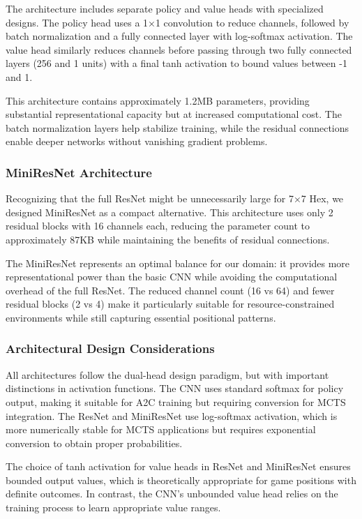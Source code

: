 \documentclass[conference]{IEEEtran}
\begin{document}
The architecture includes separate policy and value heads with specialized designs. The policy head uses a 1×1 convolution to reduce channels, followed by batch normalization and a fully connected layer with log-softmax activation. The value head similarly reduces channels before passing through two fully connected layers (256 and 1 units) with a final tanh activation to bound values between -1 and 1.

This architecture contains approximately 1.2MB parameters, providing substantial representational capacity but at increased computational cost. The batch normalization layers help stabilize training, while the residual connections enable deeper networks without vanishing gradient problems.

\subsubsection{MiniResNet Architecture}

Recognizing that the full ResNet might be unnecessarily large for 7×7 Hex, we designed MiniResNet as a compact alternative. This architecture uses only 2 residual blocks with 16 channels each, reducing the parameter count to approximately 87KB while maintaining the benefits of residual connections.

The MiniResNet represents an optimal balance for our domain: it provides more representational power than the basic CNN while avoiding the computational overhead of the full ResNet. The reduced channel count (16 vs 64) and fewer residual blocks (2 vs 4) make it particularly suitable for resource-constrained environments while still capturing essential positional patterns.

\subsubsection{Architectural Design Considerations}

All architectures follow the dual-head design paradigm, but with important distinctions in activation functions. The CNN uses standard softmax for policy output, making it suitable for A2C training but requiring conversion for MCTS integration. The ResNet and MiniResNet use log-softmax activation, which is more numerically stable for MCTS applications but requires exponential conversion to obtain proper probabilities.

The choice of tanh activation for value heads in ResNet and MiniResNet ensures bounded output values, which is theoretically appropriate for game positions with definite outcomes. In contrast, the CNN's unbounded value head relies on the training process to learn appropriate value ranges.
\end{document}
